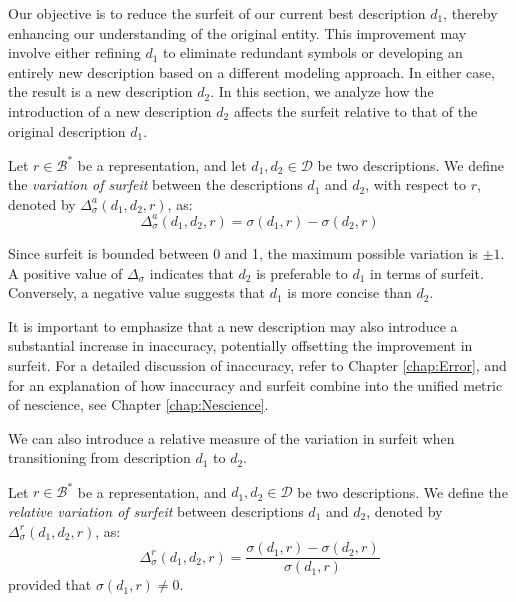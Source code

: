 Our objective is to reduce the surfeit of our current best description $d_1$, thereby enhancing our understanding of the original entity. This improvement may involve either refining $d_1$ to eliminate redundant symbols or developing an entirely new description based on a different modeling approach. In either case, the result is a new description $d_2$. In this section, we analyze how the introduction of a new description $d_2$ affects the surfeit relative to that of the original description $d_1$.

\begin{definition}
Let $r \in \mathcal{B}^\ast$ be a representation, and let $d_1, d_2 \in \mathcal{D}$ be two descriptions. We define the \emph{variation of surfeit} between the descriptions $d_1$ and $d_2$, with respect to $r$, denoted by $\Delta^{a}_{\sigma} ( d_1, d_2, r )$, as:
\[
\Delta^{a}_{\sigma} ( d_1, d_2, r ) = \sigma(d_1, r) - \sigma(d_2, r)
\]
\end{definition}

Since surfeit is bounded between 0 and 1, the maximum possible variation is $\pm 1$. A positive value of $\Delta_{\sigma}$ indicates that $d_2$ is preferable to $d_1$ in terms of surfeit. Conversely, a negative value suggests that $d_1$ is more concise than $d_2$.

It is important to emphasize that a new description may also introduce a substantial increase in inaccuracy, potentially offsetting the improvement in surfeit. For a detailed discussion of inaccuracy, refer to Chapter \ref{chap:Error}, and for an explanation of how inaccuracy and surfeit combine into the unified metric of nescience, see Chapter \ref{chap:Nescience}.

We can also introduce a relative measure of the variation in surfeit when transitioning from description $d_1$ to $d_2$.

\begin{definition}
Let $r \in \mathcal{B}^\ast$ be a representation, and $d_1, d_2 \in \mathcal{D}$ be two descriptions. We define the \emph{relative variation of surfeit} between descriptions $d_1$ and $d_2$, denoted by $\Delta^{r}_{\sigma}(d_1, d_2, r)$, as:
\[
\Delta^{r}_{\sigma}(d_1, d_2, r) = \frac{\sigma(d_1, r) - \sigma(d_2, r)}{\sigma(d_1, r)}
\]
provided that $\sigma(d_1, r) \neq 0$.
\end{definition}

